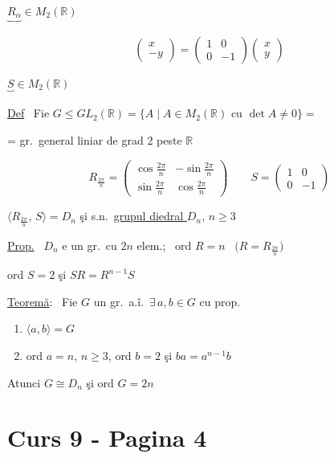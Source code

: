 \noindent $\underbrace{R_\alpha}_{} \in M_2(\mathbb{R})$

\bigskip
\noindent
\[
\begin{pmatrix}x\\-y\end{pmatrix} = \begin{pmatrix}1&0\\0&-1\end{pmatrix}\begin{pmatrix}x\\y\end{pmatrix}
\]

\noindent $\underbrace{S}_{}\in M_2(\mathbb{R})$

\bigskip
\noindent\underline{Def} \ Fie $G\leq GL_2(\mathbb{R}) = \{A \mid A\in M_2(\mathbb{R}) \text{ cu } \det A\neq 0\} =$

\noindent = gr.\ general liniar de grad 2 peste $\mathbb{R}$

\bigskip
\noindent
\[
R_{\frac{2\pi}{n}} = \begin{pmatrix}\cos\frac{2\pi}{n} & -\sin\frac{2\pi}{n}\\[4pt] \sin\frac{2\pi}{n} & \cos\frac{2\pi}{n}\end{pmatrix}
\qquad
S=\begin{pmatrix}1&0\\0&-1\end{pmatrix}
\]

\bigskip
\noindent $\Big\langle R_{\frac{2\pi}{n}},\,S\Big\rangle = D_n$ şi s.n.\ \underline{grupul diedral $D_n$}, $n\geq 3$

\bigskip
\noindent\underline{Prop.} \ $D_n$ e un gr.\ cu $2n$ elem.; \ ord $R=n$ \ $\big(R=R_{\frac{2\pi}{n}}\big)$

\noindent ord $S=2$ şi $SR=R^{n-1}S$

\bigskip
\noindent\underline{Teoremă}: \ Fie $G$ un gr.\ a.î.\ $\exists\,a,b\in G$ cu prop.

\begin{enumerate}
\item[1)] $\langle a,b\rangle = G$
\item[2)] ord $a=n$, $n\geq 3$, ord $b=2$ şi $ba=a^{n-1}b$
\end{enumerate}

\noindent Atunci $G\cong D_n$ şi ord $G=2n$


\section*{Curs 9 - Pagina 4}

